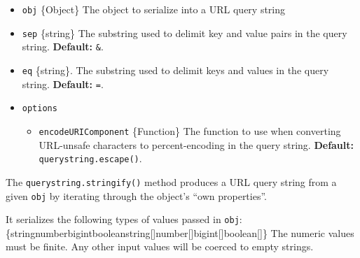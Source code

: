 \begin{itemize}
\tightlist
\item
  \texttt{obj} \{Object\} The object to serialize into a URL query
  string
\item
  \texttt{sep} \{string\} The substring used to delimit key and value
  pairs in the query string. \textbf{Default:}
  \texttt{\textquotesingle{}\&\textquotesingle{}}.
\item
  \texttt{eq} \{string\}. The substring used to delimit keys and values
  in the query string. \textbf{Default:}
  \texttt{\textquotesingle{}=\textquotesingle{}}.
\item
  \texttt{options}

  \begin{itemize}
  \tightlist
  \item
    \texttt{encodeURIComponent} \{Function\} The function to use when
    converting URL-unsafe characters to percent-encoding in the query
    string. \textbf{Default:} \texttt{querystring.escape()}.
  \end{itemize}
\end{itemize}

The \texttt{querystring.stringify()} method produces a URL query string
from a given \texttt{obj} by iterating through the object's ``own
properties''.

It serializes the following types of values passed in \texttt{obj}:
\{string\textbar number\textbar bigint\textbar boolean\textbar string{[}{]}\textbar number{[}{]}\textbar bigint{[}{]}\textbar boolean{[}{]}\}
The numeric values must be finite. Any other input values will be
coerced to empty strings.

\begin{Shaded}
\begin{Highlighting}[]
\NormalTok{(\{ }\OperatorTok{:} \OperatorTok{,} \OperatorTok{:}\NormalTok{ [}\OperatorTok{,} \NormalTok{]}\OperatorTok{,} \OperatorTok{:} \StringTok{\textquotesingle{}\textquotesingle{}}\NormalTok{ \})}\OperatorTok{;}

\NormalTok{(\{ }\OperatorTok{:} \OperatorTok{,} \OperatorTok{:} \NormalTok{ \}}\OperatorTok{,} \StringTok{\textquotesingle{};\textquotesingle{}}\OperatorTok{,} \StringTok{\textquotesingle{}:\textquotesingle{}}\NormalTok{)}\OperatorTok{;}
\end{Highlighting}
\end{Shaded}

